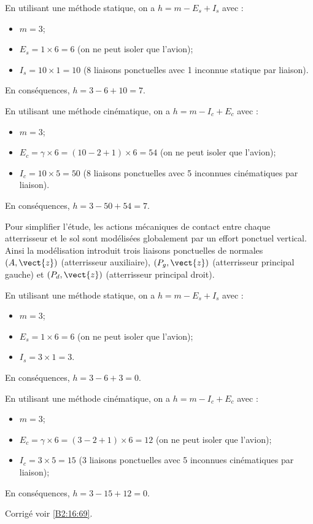 En utilisant une méthode statique, on a $h=m-E_s+I_s$ avec : 
\begin{itemize}
\item  $m=3$;
\item $E_s = 1\times 6 = 6$ (on ne peut isoler que l'avion);
\item $I_s = 10 \times 1 = 10$ (8 liaisons ponctuelles avec 1 inconnue statique par liaison).
\end{itemize}
En conséquences, $h = 3-6+10 =7$. 

En utilisant une méthode cinématique, on a $h=m-I_c+E_c$ avec : 
\begin{itemize}
\item  $m=3$;
\item $E_c = \gamma \times 6 = (10-2+1) \times 6 = 54$ (on ne peut isoler que l'avion);
\item $I_c = 10 \times 5 = 50$ (8 liaisons ponctuelles avec 5 inconnues cinématiques par liaison).
\end{itemize}
En conséquences, $h = 3-50+54 =7$. 

\else 
\fi

Pour simplifier l’étude, les actions mécaniques de contact entre chaque atterrisseur et
le sol sont modélisées globalement par un effort ponctuel vertical. Ainsi la modélisation
introduit trois liaisons ponctuelles de normales $(A, \vect{z})$ (atterrisseur
auxiliaire), $(P_g, \vect{z})$ (atterrisseur principal gauche) et $(P_d, \vect{z})$ (atterrisseur principal droit).

\ifprof

En utilisant une méthode statique, on a $h=m-E_s+I_s$ avec : 
\begin{itemize}
\item  $m=3$;
\item $E_s = 1\times 6 = 6$ (on ne peut isoler que l'avion);
\item $I_s = 3 \times 1 = 3$.
\end{itemize}
En conséquences, $h = 3-6+3 =0$. 

En utilisant une méthode cinématique, on a $h=m-I_c+E_c$ avec : 
\begin{itemize}
\item  $m=3$;
\item $E_c = \gamma \times 6 = (3-2+1) \times 6 = 12$ (on ne peut isoler que l'avion);
\item $I_c = 3 \times 5 = 15$ (3 liaisons ponctuelles avec 5 inconnues cinématiques par liaison);
\end{itemize}
En conséquences, $h = 3-15+12 =0$. 

\else 
\fi
 
 

\ifprof
\else

\noindent\footnotesize
\normalsize

\begin{flushright}
\footnotesize{Corrigé  voir \ref{B2:16:69}.}
\end{flushright}%
\fi